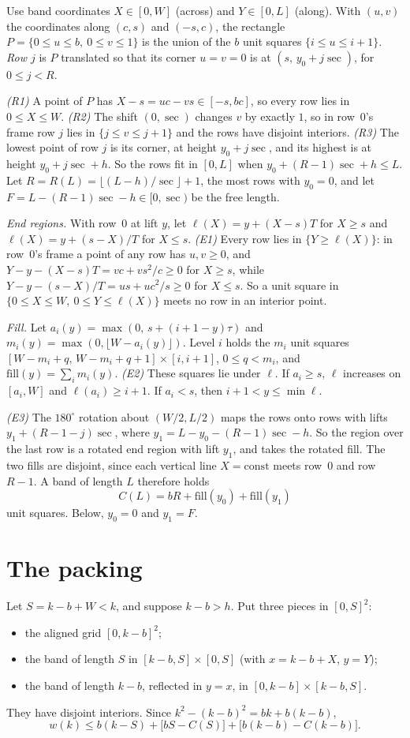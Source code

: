 \documentclass[11pt,letterpaper]{amsart}
\theoremstyle{plain}
\theoremstyle{remark}
\newcommand{\fl}[1]{\lfloor #1 \rfloor}
\begin{document}
Use band coordinates $X\in[0,W]$ (across) and $Y\in[0,L]$ (along). With $(u,v)$ the coordinates along $(c,s)$ and $(-s,c)$, the rectangle $P=\{0\le u\le b,\ 0\le v\le1\}$ is the union of the $b$ unit squares $\{i\le u\le i+1\}$. \emph{Row $j$} is $P$ translated so that its corner $u=v=0$ is at $(s,\,y_0+j\sec)$, for $0\le j<R$.

\emph{(R1)} A point of $P$ has $X-s=uc-vs\in[-s,bc]$, so every row lies in $0\le X\le W$. \emph{(R2)} The shift $(0,\sec)$ changes $v$ by exactly $1$, so in row~$0$'s frame row $j$ lies in $\{j\le v\le j+1\}$ and the rows have disjoint interiors. \emph{(R3)} The lowest point of row $j$ is its corner, at height $y_0+j\sec$, and its highest is at height $y_0+j\sec+h$. So the rows fit in $[0,L]$ when $y_0+(R-1)\sec+h\le L$. Let $R=R(L)=\fl{(L-h)/\sec}+1$, the most rows with $y_0=0$, and let $F=L-(R-1)\sec-h\in[0,\sec)$ be the free length.

\emph{End regions.} With row~$0$ at lift $y$, let $\ell(X)=y+(X-s)T$ for $X\ge s$ and $\ell(X)=y+(s-X)/T$ for $X\le s$. \emph{(E1)} Every row lies in $\{Y\ge\ell(X)\}$: in row~$0$'s frame a point of any row has $u,v\ge0$, and $Y-y-(X-s)T=vc+vs^2/c\ge0$ for $X\ge s$, while $Y-y-(s-X)/T=us+uc^2/s\ge0$ for $X\le s$. So a unit square in $\{0\le X\le W,\ 0\le Y\le\ell(X)\}$ meets no row in an interior point.

\emph{Fill.} Let $a_i(y)=\max(0,\,s+(i+1-y)\tau)$ and $m_i(y)=\max(0,\fl{W-a_i(y)})$. Level $i$ holds the $m_i$ unit squares $[W-m_i+q,\,W-m_i+q+1]\times[i,i+1]$, $0\le q<m_i$, and $\mathrm{fill}(y)=\sum_i m_i(y)$. \emph{(E2)} These squares lie under $\ell$. If $a_i\ge s$, $\ell$ increases on $[a_i,W]$ and $\ell(a_i)\ge i+1$. If $a_i<s$, then $i+1<y\le\min\ell$.

\emph{(E3)} The $180^\circ$ rotation about $(W/2,L/2)$ maps the rows onto rows with lifts $y_1+(R-1-j)\sec$, where $y_1=L-y_0-(R-1)\sec-h$. So the region over the last row is a rotated end region with lift $y_1$, and takes the rotated fill. The two fills are disjoint, since each vertical line $X=\mathrm{const}$ meets row~$0$ and row $R-1$. A band of length $L$ therefore holds
\[
C(L)=bR+\mathrm{fill}(y_0)+\mathrm{fill}(y_1)
\]
unit squares. Below, $y_0=0$ and $y_1=F$.

\section{The packing}

Let $S=k-b+W<k$, and suppose $k-b>h$. Put three pieces in $[0,S]^2$:
\begin{itemize}
\item the aligned grid $[0,k-b]^2$;
\item the band of length $S$ in $[k-b,S]\times[0,S]$ (with $x=k-b+X$, $y=Y$);
\item the band of length $k-b$, reflected in $y=x$, in $[0,k-b]\times[k-b,S]$.
\end{itemize}
They have disjoint interiors. Since $k^2-(k-b)^2=bk+b(k-b)$,
\begin{equation}\label{eq:waste}
w(k)\le b(k-S)+\bigl[bS-C(S)\bigr]+\bigl[b(k-b)-C(k-b)\bigr].
\end{equation}
\end{document}
